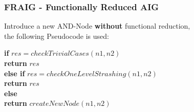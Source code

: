 \documentclass{beamer}
\begin{document}
\begin{frame}
\frametitle{FRAIG - Functionally Reduced AIG}

Introduce a new AND-Node \textbf{without} functional reduction,\\
the following Pseudocode is used:\\

\bigskip

\textbf{if} $res=checkTrivialCases(n1, n2) $\\
\noindent\hspace*{6mm} \textbf{return} $res$ \\
\textbf{else if} $res=checkOneLevelStrashing(n1, n2) $\\
\noindent\hspace*{6mm} \textbf{return} $res$ \\
\textbf{else} \\
\noindent\hspace*{6mm} \textbf{return} $createNewNode(n1,n2)$ \\


\end{frame}
\end{document}
